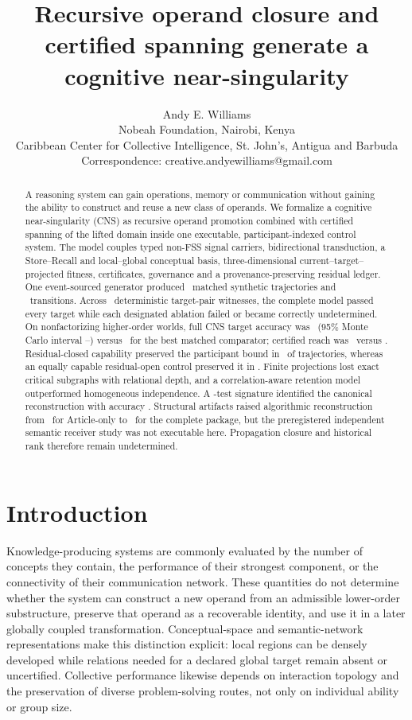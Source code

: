 \documentclass[10pt]{article}
\title{\textbf{Recursive operand closure and certified spanning generate a cognitive near-singularity}}
\author{Andy E. Williams\\
\small Nobeah Foundation, Nairobi, Kenya\\
\small Caribbean Center for Collective Intelligence, St. John's, Antigua and Barbuda\\
\small Correspondence: creative.andyewilliams@gmail.com}
\date{}
\begin{document}
\maketitle
\linenumbers

\begin{abstract}
A reasoning system can gain operations, memory or communication without gaining the ability to construct and reuse a new class of operands. We formalize a cognitive near-singularity (CNS) as recursive operand promotion combined with certified spanning of the lifted domain inside one executable, participant-indexed control system. The model couples typed non-FSS signal carriers, bidirectional transduction, a Store--Recall and local--global conceptual basis, three-dimensional current--target--projected fitness, certificates, governance and a provenance-preserving residual ledger. One event-sourced generator produced \TotalTraj\ matched synthetic trajectories and \TotalEvents\ transitions. Across \NumWitnesses\ deterministic target-pair witnesses, the complete model passed every target while each designated ablation failed or became correctly undetermined. On nonfactorizing higher-order worlds, full CNS target accuracy was \FullHighAcc\ (95\% Monte Carlo interval \FullHighAccLo--\FullHighAccHi) versus \BestHighAcc\ for the best matched comparator; certified reach was \FullHighReach\ versus \BestHighReach. Residual-closed capability preserved the participant bound in \FullContain\ of trajectories, whereas an equally capable residual-open control preserved it in \IncContain. Finite projections lost exact critical subgraphs with relational depth, and a correlation-aware retention model outperformed homogeneous independence. A \CodeTests-test signature identified the canonical reconstruction with accuracy \CanonicalID. Structural artifacts raised algorithmic reconstruction from \ArticlePass\ for Article-only to \CompletePass\ for the complete package, but the preregistered independent semantic receiver study was not executable here. Propagation closure and historical rank therefore remain undetermined.
\end{abstract}

\section*{Introduction}
Knowledge-producing systems are commonly evaluated by the number of concepts they contain, the performance of their strongest component, or the connectivity of their communication network. These quantities do not determine whether the system can construct a new operand from an admissible lower-order substructure, preserve that operand as a recoverable identity, and use it in a later globally coupled transformation. Conceptual-space and semantic-network representations make this distinction explicit: local regions can be densely developed while relations needed for a declared global target remain absent or uncertified\citep{gardenfors2000,collins1975,krenn2020}. Collective performance likewise depends on interaction topology and the preservation of diverse problem-solving routes, not only on individual ability or group size\citep{woolley2010,hong2004,lazer2007,lorenz2011}.
\end{document}
